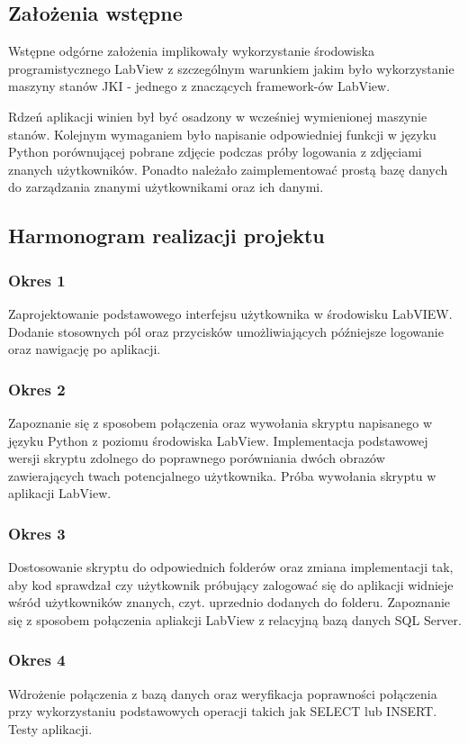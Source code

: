 \documentclass{report}
\begin{document}
\subsection{\Large Założenia wstępne}
Wstępne odgórne założenia implikowały wykorzystanie środowiska programistycznego LabView z szczególnym warunkiem jakim było wykorzystanie 
maszyny stanów JKI - jednego z znaczących framework-ów LabView. 

Rdzeń aplikacji winien był być osadzony w wcześniej wymienionej maszynie stanów. 
Kolejnym wymaganiem było napisanie odpowiedniej funkcji w języku Python porównującej pobrane zdjęcie podczas próby logowania z zdjęciami znanych użytkowników.
Ponadto należało zaimplementować prostą bazę danych do zarządzania znanymi użytkownikami oraz ich danymi. 

\subsection{\Large Harmonogram realizacji projektu}
\subsubsection{\large Okres 1}
Zaprojektowanie podstawowego interfejsu użytkownika w środowisku LabVIEW. Dodanie stosownych pól 
oraz przycisków umożliwiających późniejsze logowanie oraz nawigację po aplikacji.

\subsubsection{\large Okres 2}
Zapoznanie się z sposobem połączenia oraz wywołania skryptu napisanego w języku Python z poziomu środowiska LabView.
Implementacja podstawowej wersji skryptu zdolnego do poprawnego porówniania dwóch obrazów zawierających twach potencjalnego użytkownika.
Próba wywołania skryptu w aplikacji LabView.

\subsubsection{\large Okres 3}
Dostosowanie skryptu do odpowiednich folderów oraz zmiana implementacji tak, aby kod sprawdzał czy użytkownik próbujący zalogować się do aplikacji widnieje wśród użytkowników 
znanych, czyt. uprzednio dodanych do folderu.
Zapoznanie się z sposobem połączenia apliakcji LabView z relacyjną bazą danych SQL Server.

\subsubsection{\large Okres 4}
Wdrożenie połączenia z bazą danych oraz weryfikacja poprawności połączenia przy wykorzystaniu podstawowych operacji takich jak SELECT lub INSERT.
Testy aplikacji.
\end{document}
